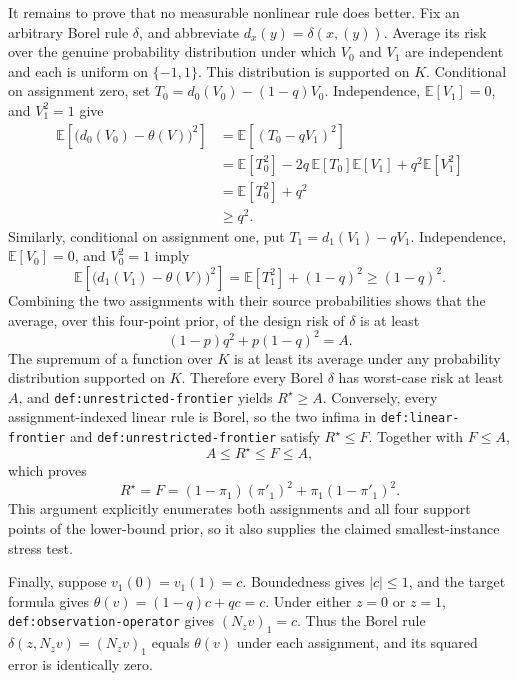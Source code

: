 It remains to prove that no measurable nonlinear rule does better. Fix an arbitrary Borel rule \(\delta\), and abbreviate \(d_x(y)=\delta(x,(y))\). Average its risk over the genuine probability distribution under which \(V_0\) and \(V_1\) are independent and each is uniform on \(\{-1,1\}\). This distribution is supported on \(K\). Conditional on assignment zero, set \(T_0=d_0(V_0)-(1-q)V_0\). Independence, \(\mathbb E[V_1]=0\), and \(V_1^2=1\) give
\[
\begin{aligned}
\mathbb E\!\left[\bigl(d_0(V_0)-\theta(V)\bigr)^2\right]
&=\mathbb E\!\left[(T_0-qV_1)^2\right]\\
&=\mathbb E[T_0^2]-2q\,\mathbb E[T_0]\mathbb E[V_1]+q^2\mathbb E[V_1^2]\\
&=\mathbb E[T_0^2]+q^2\\
&\ge q^2.
\end{aligned}
\]
Similarly, conditional on assignment one, put \(T_1=d_1(V_1)-qV_1\). Independence, \(\mathbb E[V_0]=0\), and \(V_0^2=1\) imply
\[
\mathbb E\!\left[\bigl(d_1(V_1)-\theta(V)\bigr)^2\right]
=\mathbb E[T_1^2]+(1-q)^2
\ge(1-q)^2.
\]
Combining the two assignments with their source probabilities shows that the average, over this four-point prior, of the design risk of \(\delta\) is at least
\[
(1-p)q^2+p(1-q)^2=A.
\]
The supremum of a function over \(K\) is at least its average under any probability distribution supported on \(K\). Therefore every Borel \(\delta\) has worst-case risk at least \(A\), and \texttt{def:unrestricted-frontier} yields \(R^{\star}\ge A\). Conversely, every assignment-indexed linear rule is Borel, so the two infima in \texttt{def:linear-frontier} and \texttt{def:unrestricted-frontier} satisfy \(R^{\star}\le F\). Together with \(F\le A\),
\[
A\le R^{\star}\le F\le A,
\]
which proves
\[
R^{\star}=F=(1-\pi_1)(\pi'_1)^2+\pi_1(1-\pi'_1)^2.
\]
This argument explicitly enumerates both assignments and all four support points of the lower-bound prior, so it also supplies the claimed smallest-instance stress test.

Finally, suppose \(v_1(0)=v_1(1)=c\). Boundedness gives \(|c|\le1\), and the target formula gives \(\theta(v)=(1-q)c+qc=c\). Under either \(z=0\) or \(z=1\), \texttt{def:observation-operator} gives \((N_zv)_1=c\). Thus the Borel rule \(\delta(z,N_zv)=(N_zv)_1\) equals \(\theta(v)\) under each assignment, and its squared error is identically zero.